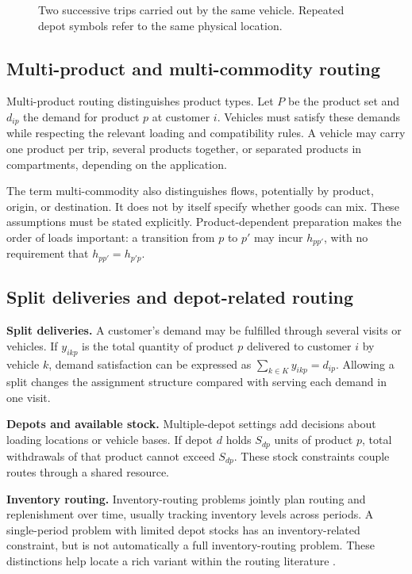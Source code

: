 \begin{figure}[htbp]
 \centering
 
 \caption{Two successive trips carried out by the same vehicle. Repeated depot
 symbols refer to the same physical location.}
 \label{fig:multiple-trips}
\end{figure}

\subsection{Multi-product and multi-commodity routing}

Multi-product routing distinguishes product types. Let $P$ be the product set
and $d_{ip}$ the demand for product $p$ at customer $i$. Vehicles must satisfy
these demands while respecting the relevant loading and compatibility rules.
A vehicle may carry one product per trip, several products together, or
separated products in compartments, depending on the application.

The term multi-commodity also distinguishes flows, potentially by product,
origin, or destination. It does not by itself specify whether goods can mix.
These assumptions must be stated explicitly. Product-dependent preparation
makes the order of loads important: a transition from $p$ to $p'$ may incur
$h_{pp'}$, with no requirement that $h_{pp'}=h_{p'p}$.

\subsection{Split deliveries and depot-related routing}

\textbf{Split deliveries.} A customer's demand may be fulfilled through
several visits or vehicles. If $y_{ikp}$ is the total quantity of product $p$
delivered to customer $i$ by vehicle $k$, demand satisfaction can be expressed
as $\sum_{k\in K}y_{ikp}=d_{ip}$. Allowing a split changes the assignment
structure compared with serving each demand in one visit.

\textbf{Depots and available stock.} Multiple-depot settings add decisions
about loading locations or vehicle bases. If depot $d$ holds $S_{dp}$ units
of product $p$, total withdrawals of that product cannot exceed $S_{dp}$.
These stock constraints couple routes through a shared resource.

\textbf{Inventory routing.} Inventory-routing problems jointly plan routing
and replenishment over time, usually tracking inventory levels across periods.
A single-period problem with limited depot stocks has an inventory-related
constraint, but is not automatically a full inventory-routing problem.
These distinctions help locate a rich variant within the routing literature
\cite{toth2014vehicle,lahyani2015taxonomy}.

